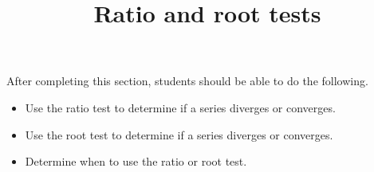 \documentclass{ximera}
\title{Ratio and root tests}
\begin{document}
\begin{abstract}
\end{abstract}

\maketitle

\begin{sectionOutcomes}

After completing this section, students should be able to do the following.

\begin{itemize}
\item Use the ratio test to determine if a series diverges or converges.
\item Use the root test to determine if a series diverges or converges.
\item Determine when to use the ratio or root test.
\end{itemize}

\end{sectionOutcomes}
\end{document}
